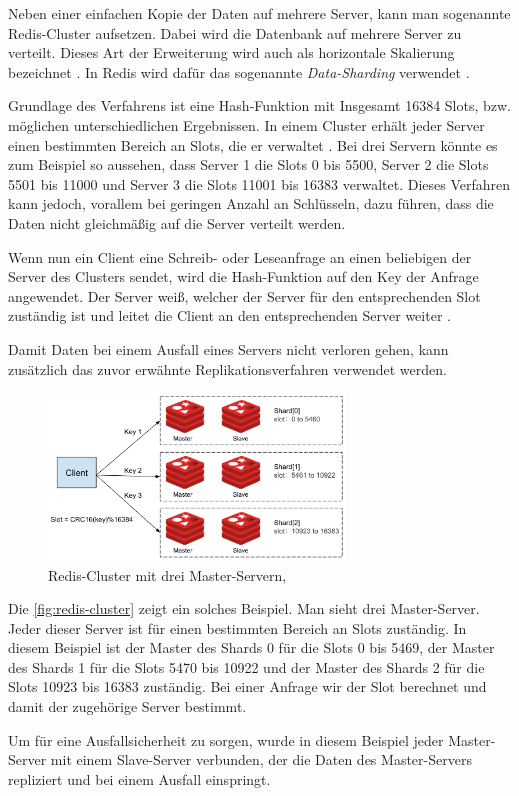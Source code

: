 Neben einer einfachen Kopie der Daten auf mehrere Server, kann man sogenannte Redis-Cluster aufsetzen. Dabei wird die Datenbank auf mehrere Server zu verteilt.
Dieses Art der Erweiterung wird auch als horizontale Skalierung bezeichnet \cite{Fasel2016}.
In Redis wird dafür das sogenannte \textit{Data-Sharding} verwendet \cite{Redis-Docs-Scaling}.

Grundlage des Verfahrens ist eine Hash-Funktion mit Insgesamt 16384 Slots, bzw. möglichen unterschiedlichen Ergebnissen.
In einem Cluster erhält jeder Server einen bestimmten Bereich an Slots, die er verwaltet \cite{Redis-Docs-Scaling}.
Bei drei Servern könnte es zum Beispiel so aussehen, dass Server 1 die Slots 0 bis 5500, Server 2 die Slots 5501 bis 11000 und Server 3 die Slots 11001 bis 16383 verwaltet.
Dieses Verfahren kann jedoch, vorallem bei geringen Anzahl an Schlüsseln, dazu führen, dass die Daten nicht gleichmäßig auf die Server verteilt werden. 

Wenn nun ein Client eine Schreib- oder Leseanfrage an einen beliebigen der Server des Clusters sendet, wird die Hash-Funktion auf den Key der Anfrage angewendet.
Der Server weiß, welcher der Server für den entsprechenden Slot zuständig ist und leitet die Client an den entsprechenden Server weiter \cite{Redis-Docs-Scaling}.

Damit Daten bei einem Ausfall eines Servers nicht verloren gehen, kann zusätzlich das zuvor erwähnte Replikationsverfahren verwendet werden.

\begin{figure}
    \centering
    \includegraphics[width=0.7\textwidth]{images/redis-cluster.png}
    \caption{Redis-Cluster mit drei Master-Servern, \cite{aeraki}}
    \label{fig:redis-cluster} 
\end{figure}

Die \autoref{fig:redis-cluster} zeigt ein solches Beispiel.
Man sieht drei Master-Server. Jeder dieser Server ist für einen bestimmten Bereich an Slots zuständig.
In diesem Beispiel ist der Master des Shards 0 für die Slots 0 bis 5469, der Master des Shards 1 für die Slots 5470 bis 10922 und der Master des Shards 2 für die Slots 10923 bis 16383 zuständig.
Bei einer Anfrage wir der Slot berechnet und damit der zugehörige Server bestimmt. 

Um für eine Ausfallsicherheit zu sorgen, wurde in diesem Beispiel jeder Master-Server mit einem Slave-Server verbunden, der die Daten des Master-Servers repliziert und bei einem Ausfall einspringt.






